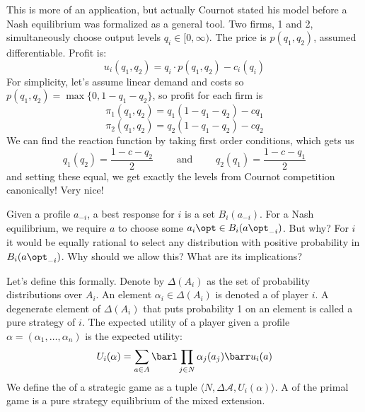 \documentclass[10pt]{article}
\begin{document}
\begin{example}
	 This is more of an application, but actually Cournot stated his model before a Nash equilibrium was formalized as a general tool. Two firms, 1 and 2, simultaneously choose output levels $q_i \in [0,\infty)$. The price is $p(q_1,q_2)$, assumed differentiable. Profit is: \[u_i(q_1,q_2) = q_i \cdot p(q_1,q_2) - c_i(q_i)\] For simplicity, let's assume linear demand and costs so $p(q_1,q_2) = \max\{0,1-q_1-q_2\}$, so profit for each firm is \[\pi_1(q_1,q_2) = q_1(1-q_1-q_2) - cq_1\]\[\pi_2(q_1,q_2) = q_2(1-q_1-q_2) - cq_2\]We can find the reaction function by taking first order conditions, which gets us\[q_1(q_2) = \frac{1-c-q_2}{2}\qquad \text{ and } \qquad q_2(q_1) = \frac{1-c-q_1}{2}\] and setting these equal, we get exactly the levels from Cournot competition canonically! Very nice!
\end{example}

\begin{remark}
	Given a profile $a_{-i}$, a best response for $i$ is a set $B_i(a_{-i})$. For a Nash equilibrium, we require $a$ to choose some $a_i\opt \in B_i(a\opt_{-i})$. But why? For $i$ it would be equally rational to select any distribution with positive probability in $B_i(a\opt_{-i})$. Why should we allow this? What are its implications?
\end{remark}

\begin{definition}
	Let's define this formally. Denote by $\Delta(A_i)$ as the set of probability distributions over $A_i$. An element $\alpha_i \in \Delta(A_i)$ is denoted a  of player $i$. A degenerate element of $\Delta(A_i)$ that puts probability 1 on an element is called a pure strategy of $i$. The expected utility of a player given a profile $\alpha = (\alpha_1,\dots,\alpha_n)$ is the expected utility:
	\[
	U_i(\alpha) = \sum_{a \in A} \barl \prod_{j \in N} \alpha_j(a_j)\barr u_i(a)
	\]
	We define the  of a strategic game as a tuple $\langle N, \Delta \mathcal{A}, U_i(\alpha)\rangle$. A  of the primal game is a pure strategy equilibrium of the mixed extension.
\end{definition}
\end{document}
